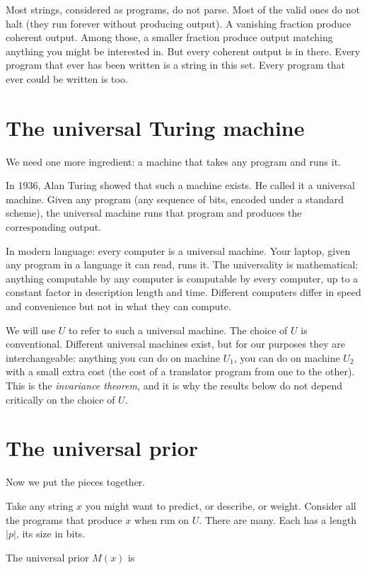 Most strings, considered as programs, do not parse. Most of the valid ones do not halt (they run forever without producing output). A vanishing fraction produce coherent output. Among those, a smaller fraction produce output matching anything you might be interested in. But every coherent output is in there. Every program that ever has been written is a string in this set. Every program that ever could be written is too.

\section*{The universal Turing machine}

We need one more ingredient: a machine that takes any program and runs it.

In 1936, Alan Turing showed that such a machine exists. He called it a universal machine. Given any program (any sequence of bits, encoded under a standard scheme), the universal machine runs that program and produces the corresponding output.

In modern language: every computer is a universal machine. Your laptop, given any program in a language it can read, runs it. The universality is mathematical: anything computable by any computer is computable by every computer, up to a constant factor in description length and time. Different computers differ in speed and convenience but not in what they can compute.

We will use $U$ to refer to such a universal machine. The choice of $U$ is conventional. Different universal machines exist, but for our purposes they are interchangeable: anything you can do on machine $U_1$, you can do on machine $U_2$ with a small extra cost (the cost of a translator program from one to the other). This is the \emph{invariance theorem}, and it is why the results below do not depend critically on the choice of $U$.

\section*{The universal prior}

Now we put the pieces together.

Take any string $x$ you might want to predict, or describe, or weight. Consider all the programs that produce $x$ when run on $U$. There are many. Each has a length $|p|$, its size in bits.

The universal prior $M(x)$ is

